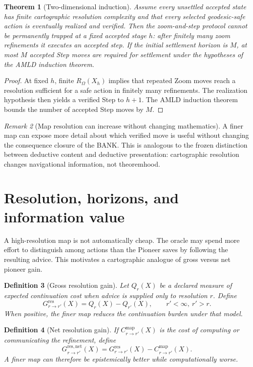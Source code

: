 \documentclass[11pt]{article}
\newtheorem{definition}{Definition}[section]
\newtheorem{theorem}[definition]{Theorem}
\theoremstyle{remark}
\newtheorem{remark}[definition]{Remark}
\newcommand{\Omni}{\Omega}
\begin{document}
\begin{theorem}[Two-dimensional induction]
Assume every unsettled accepted state has finite cartographic resolution complexity and that every selected geodesic-safe action is eventually realized and verified. Then the zoom-and-step protocol cannot be permanently trapped at a fixed accepted stage $h$: after finitely many zoom refinements it executes an accepted step. If the initial settlement horizon is $M$, at most $M$ accepted Step moves are required for settlement under the hypotheses of the AMLD induction theorem.
\end{theorem}
\begin{proof}
At fixed $h$, finite $R_{\Omni}(X_h)$ implies that repeated Zoom moves reach a resolution sufficient for a safe action in finitely many refinements. The realization hypothesis then yields a verified Step to $h+1$. The AMLD induction theorem bounds the number of accepted Step moves by $M$.
\end{proof}

\begin{remark}[Map resolution can increase without changing mathematics]
A finer map can expose more detail about which verified move is useful without changing the consequence closure of the BANK. This is analogous to the frozen distinction between deductive content and deductive presentation: cartographic resolution changes navigational information, not theoremhood.
\end{remark}

\section{Resolution, horizons, and information value}

A high-resolution map is not automatically cheap. The oracle may spend more effort to distinguish among actions than the Pioneer saves by following the resulting advice. This motivates a cartographic analogue of gross versus net pioneer gain.

\begin{definition}[Gross resolution gain]
Let $Q_r(X)$ be a declared measure of expected continuation cost when advice is supplied only to resolution $r$. Define
\[
G^{\mathrm{res}}_{r\to r'}(X)=Q_r(X)-Q_{r'}(X),\qquad r'<\infty,\ r'>r.
\]
When positive, the finer map reduces the continuation burden under that model.
\end{definition}

\begin{definition}[Net resolution gain]
If $C_{r\to r'}^{\mathrm{map}}(X)$ is the cost of computing or communicating the refinement, define
\[
G^{\mathrm{res,net}}_{r\to r'}(X)
=G^{\mathrm{res}}_{r\to r'}(X)-C_{r\to r'}^{\mathrm{map}}(X).
\]
A finer map can therefore be epistemically better while computationally worse.
\end{definition}
\end{document}

